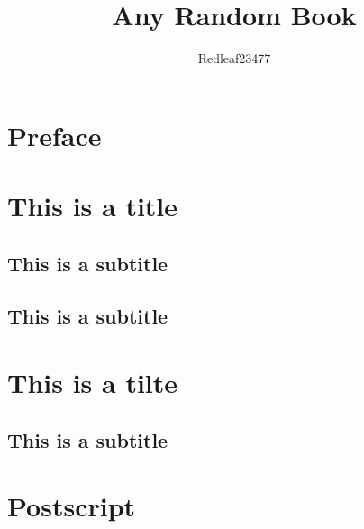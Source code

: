 \documentclass{report}
\author{Redleaf23477}
\title{Any Random Book}
\begin{document}

\maketitle
\pagebreak

\chapter*{Preface}
\blindtext
\pagebreak

\tableofcontents
{}
\pagebreak

\setcounter{page}{1}

\chapter{This is a title}
\blindtext

\section{This is a subtitle}
\blindtext
\blindtext
\blindtext

\section{This is a subtitle}
\blindtext

\chapter{This is a tilte}
\blindtext

\section{This is a subtitle}
\blindtext

\pagebreak
\chapter*{Postscript}
\blindtext
\end{document}
